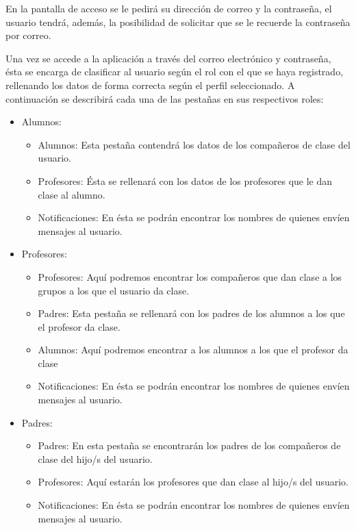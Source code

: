 		En la pantalla de acceso se le pedirá su dirección de correo y la contraseña, el usuario tendrá, además, la posibilidad de solicitar que se le recuerde la contraseña por correo.
		
		\bigskip
		Una vez se accede a la aplicación a través del correo electrónico y contraseña, ésta se encarga de clasificar al usuario según el rol con el que se haya registrado, rellenando los datos de forma correcta según el perfil seleccionado. A continuación se describirá cada una de las pestañas en sus respectivos roles:
		\bigskip
		\begin{itemize}
			\item Alumnos:
				\begin{itemize}
					\item Alumnos: Esta pestaña contendrá los datos de los compañeros de clase del usuario.
					\item Profesores: Ésta se rellenará con los datos de los profesores que le dan clase al alumno.
					\item Notificaciones: En ésta se podrán encontrar los nombres de quienes envíen mensajes al usuario.
				\end{itemize}
			\item Profesores:
				\begin{itemize}
					\item Profesores: Aquí podremos encontrar los compañeros que dan clase a los grupos a los que el usuario da clase.
					\item Padres: Esta pestaña se rellenará con los padres de los alumnos a los que el profesor da clase.
					\item Alumnos: Aquí podremos encontrar a los alumnos a los que el profesor da clase
					\item Notificaciones: En ésta se podrán encontrar los nombres de quienes envíen mensajes al usuario.
				\end{itemize}
			\item Padres:
				\begin{itemize}
					\item Padres: En esta pestaña se encontrarán los padres de los compañeros de clase del hijo/s del usuario.
					\item Profesores: Aquí estarán los profesores que dan clase al hijo/s del usuario.
					\item Notificaciones: En ésta se podrán encontrar los nombres de quienes envíen mensajes al usuario.
				\end{itemize}
		\end{itemize}
										
